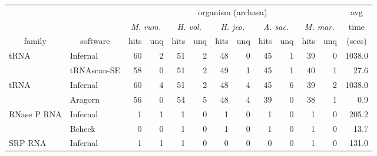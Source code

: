 \begin{footnotesize}

\begin{table}
\label{tbl:compare}
\begin{center}
\begin{tabular}{|l|l|rr|rr|rr|rr|rr|r|}
\multicolumn{1}{c}{} & \multicolumn{1}{c}{} &  \multicolumn{10}{c}{organism (archaea)}   & \multicolumn{1}{c}{avg} \\ \cline{3-12}
\multicolumn{1}{c}{}  &  \multicolumn{1}{c|}{}  &  \multicolumn{2}{c|}{\emph{M. rum.}}  &  \multicolumn{2}{c|}{\emph{H. vol.}}  &  \multicolumn{2}{c|}{\emph{H. jeo.}}  &  \multicolumn{2}{c|}{\emph{A. sac.}}  &  \multicolumn{2}{c|}{\emph{M. mar.}}   & \multicolumn{1}{c}{time} \\ 
\multicolumn{1}{c}{family}  &  \multicolumn{1}{c|}{software}  &  hits & unq &  hits & unq &  hits & unq &  hits & unq &  hits & unq  & \multicolumn{1}{c}{(secs)} \\ \hline 
tRNA             &  Infernal         &   60 &   2 &   51 &   2 &   48 &   0 &   45 &   1 &   39 &   0 & 1038.0  \\ 
                 &  tRNAscan-SE      &   58 &   0 &   51 &   2 &   49 &   1 &   45 &   1 &   40 &   1 &  27.6  \\ \hline
tRNA             &  Infernal         &   60 &   4 &   51 &   2 &   48 &   4 &   45 &   6 &   39 &   2 & 1038.0  \\ 
                 &  Aragorn          &   56 &   0 &   54 &   5 &   48 &   4 &   39 &   0 &   38 &   1 &   0.9  \\ \hline
RNase P RNA      &  Infernal         &    1 &   1 &    1 &   0 &    1 &   0 &    1 &   0 &    1 &   0 & 205.2  \\ 
                 &  Bcheck           &    0 &   0 &    1 &   0 &    1 &   0 &    1 &   0 &    1 &   0 &  13.7  \\ \hline
SRP RNA          &  Infernal         &    1 &   1 &    1 &   0 &    0 &   0 &    0 &   0 &    1 &   0 & 131.0  \\ 

\end{tabular}
\end{center}
\end{table}
\end{footnotesize}
